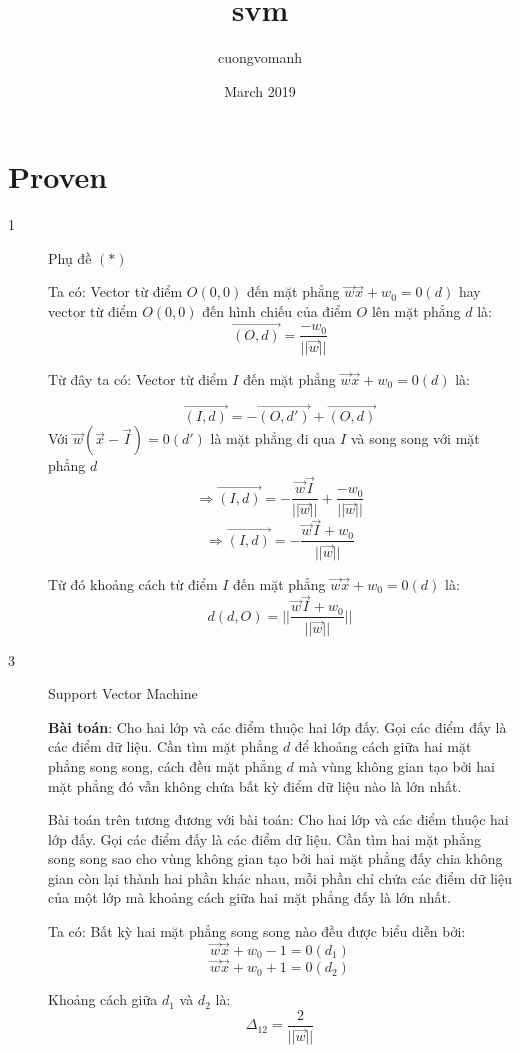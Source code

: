 \documentclass{article}
\title{svm}
\author{cuongvomanh}
\date{March 2019}
\begin{document}
    \section{Proven}
    \begin{description}
        \item[1] Phụ đề $(*)$
          
        Ta có:
        Vector từ điểm $O(0,0)$ đến mặt phẳng $\vec{w}\vec{x} + w_0 = 0 (d)$ 
        hay vector từ điểm $O(0,0)$ đến hình chiếu của điểm $O$ lên 
        mặt phẳng $d$ là:
        $$\vec{(O,d)} = \frac{-w_0}{||\vec{w}||}$$

        Từ đây ta có:
        Vector từ điểm $I$ đến mặt phẳng $\vec{w}\vec{x} + w_0 = 0 (d)$ là:
        
        $$\vec{(I,d)} = -\vec{(O,d')} + \vec{(O,d)}$$
        Với $\vec{w}(\vec{x} - \vec{I}) = 0 (d')$ 
        là mặt phẳng đi qua $I$ và song song với mặt phẳng $d$
        $$\Rightarrow \vec{(I,d)} = -\frac{\vec{w}\vec{I}}{||\vec{w}||} +  \frac{-w_0}{||\vec{w}||}$$
        $$\Rightarrow \vec{(I,d)} = -\frac{\vec{w}\vec{I}+w_0}{||\vec{w}||}$$

        Từ đó khoảng cách từ điểm $I$ đến mặt phẳng $\vec{w}\vec{x} + w_0 = 0 (d)$ là:
        $$d(d,O) = ||\frac{\vec{w}\vec{I}+w_0}{||\vec{w}||}|| $$
        

        
        
        \item[3] Support Vector Machine
        
        
         
        \textbf{Bài toán}: Cho hai lớp và các điểm thuộc hai lớp đấy. 
        Gọi các điểm đấy là các điểm dữ liệu.
        Cần tìm mặt phẳng $d$ để khoảng cách giữa hai mặt 
        phẳng song song, cách đều mặt phẳng $d$ mà vùng
        không gian tạo bởi hai mặt phẳng đó vẫn không 
        chứa bất kỳ điểm dữ liệu nào là lớn nhất.

        Bài toán trên tương đương với bài toán: \newline
        Cho hai lớp và các điểm thuộc hai lớp đấy. Gọi các điểm đấy là các điểm dữ liệu.
        Cần tìm hai mặt phẳng song song sao cho vùng không gian tạo bởi hai mặt 
        phẳng đấy chia không gian còn lại thành hai phần khác nhau, mỗi phần chỉ chứa 
        các điểm dữ liệu của một lớp mà khoảng cách giữa hai mặt phẳng đấy là lớn nhất.

        Ta có:
        Bất kỳ hai mặt phẳng song song nào đều được biểu diễn bởi:
        $$\vec{w}\vec{x} + w_0 - 1 = 0 (d_1)$$
        $$\vec{w}\vec{x} + w_0 + 1 = 0 (d_2)$$

        Khoảng cách giữa $d_1$ và $d_2$ là:
        $$\Delta _{12} = \frac{2}{||\vec{w}||}$$





    \end{description}
    
\end{document}
